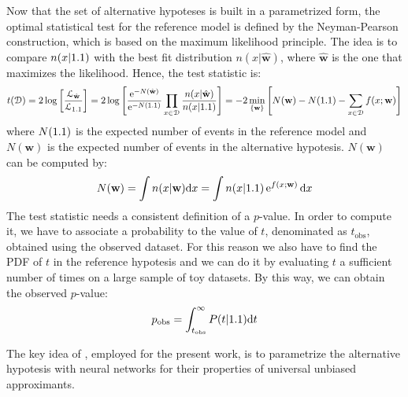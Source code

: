 Now that the set of alternative hypoteses is built in a parametrized form, the optimal statistical test for the reference model is defined by the Neyman-Pearson construction, which is based on the maximum likelihood principle\footnotemark. The idea is to compare $n(x|1.1)$ with the best fit distribution $n(x|\hat{\mathbf{w}})$, where $\hat{\mathbf{w}}$ is the one that maximizes the likelihood. Hence, the test statistic is:
\begin{equation}
	\label{eqn:T}
	t(\mathcal{D})
	=
	2 \log{\left[
	\frac{\mathcal{L}_{\hat{\mathbf{w}}}}{\mathcal{L}_{1.1}}
	\right]}
	= 
	2 \log{\left[
	\frac{\operatorname{e}^{-N(\hat{\mathbf{w}})}}{\operatorname{e}^{-N(1.1)}} \prod_{x \in \mathcal{D}} \frac{n(x|\hat{\mathbf{w}})}{n(x|1.1)}
	\right]}
	=
	-2 \min_{\{\mathbf{w}\}}{\left[
	N(\mathbf{w}) - N(1.1) - \sum_{x \in \mathcal{D}} f(x;\mathbf{w})
	\right]}
\end{equation}
where $N(1.1)$ is the expected number of events in the reference model and $N(\mathbf{w})$ is the expected number of events in the alternative hypotesis. $N(\mathbf{w})$ can be computed by:
\begin{equation}
	N(\mathbf{w}) = \int n(x|\mathbf{w}) \mathrm{d} x = \int n(x|1.1) \operatorname{e}^{f(x;\mathbf{w})} \mathrm{d} x
\end{equation}
The test statistic needs a consistent definition of a $p$-value. In order to compute it, we have to associate a probability to the value of $t$, denominated as $t_\mathrm{obs}$, obtained using the observed dataset. For this reason we also have to find the PDF of $t$ in the reference hypotesis and we can do it by evaluating $t$ a sufficient number of times on a large sample of toy datasets. By this way, we can obtain the observed $p$-value:
\begin{equation}
	p_\mathrm{obs} = \int_{t_\mathrm{obs}}^{\infty} P(t|1.1) \mathrm{d} t
\end{equation}

The key idea of \cite{wulzer}, employed for the present work, is to parametrize the alternative hypotesis with neural networks for their properties of universal unbiased approximants.


